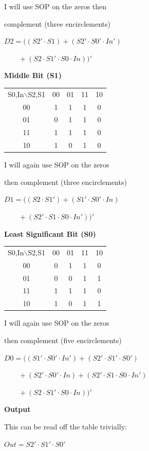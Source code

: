 {    \vspace{6pt}

    I will use SOP on the zeros then

    \noindent complement (three encirclements)

    $D2=((S2'\cdot S1)+(S2'\cdot S0'\cdot In')$

    $\qquad +(S2\cdot S1'\cdot S0\cdot In))'$

    \vspace{6pt}


    \textbf{Middle Bit (S1)}

    \begin{tabular}{c|c|c|c|c|}
    \multicolumn{1}{c}{S0,In$\backslash$S2,S1} & \multicolumn{1}{c}{00} & \multicolumn{1}{c}{01} & \multicolumn{1}{c}{11} & \multicolumn{1}{c}{10} \\ \cline{2-5}
    00 & 1 & 1 & 1 & 0 \\ \cline{2-5}
    01 & 0 & 1 & 1 & 0 \\ \cline{2-5}
    11 & 1 & 1 & 1 & 0 \\ \cline{2-5}
    10 & 1 & 0 & 1 & 0 \\ \cline{2-5}
    \end{tabular}

    I will again use SOP on the zeros

    \noindent then complement (three encirclements)

    $D1=((S2\cdot S1')+(S1'\cdot S0'\cdot In)$

    $\qquad +(S2'\cdot S1\cdot S0\cdot In'))'$


    \pagebreak

    \textbf{Least Significant Bit (S0)}

    \begin{tabular}{c|c|c|c|c|}
    \multicolumn{1}{c}{S0,In$\backslash$S2,S1} & \multicolumn{1}{c}{00} & \multicolumn{1}{c}{01} & \multicolumn{1}{c}{11} & \multicolumn{1}{c}{10} \\ \cline{2-5}
    00 & 0 & 1 & 1 & 0 \\ \cline{2-5}
    01 & 0 & 0 & 1 & 1 \\ \cline{2-5}
    11 & 1 & 1 & 1 & 0 \\ \cline{2-5}
    10 & 1 & 0 & 1 & 1 \\ \cline{2-5}
    \end{tabular}

    I will again use SOP on the zeros

    \noindent then complement (five encirclements)

    $D0=((S1'\cdot S0'\cdot In')+(S2'\cdot S1'\cdot S0')$

    $\qquad +(S2'\cdot S0'\cdot In)+(S2'\cdot S1\cdot S0\cdot In')$

    $\qquad +(S2\cdot S1'\cdot S0\cdot In))'$

    \textbf{Output}

    This can be read off the table trivially:

    $Out = S2'\cdot S1'\cdot S0'$
    }
    \onecolumn

